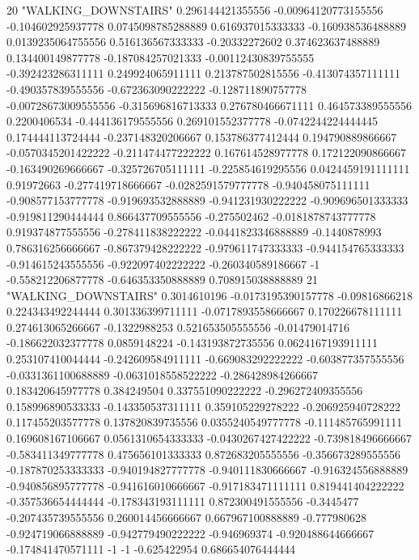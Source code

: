 20 "WALKING_DOWNSTAIRS" 0.296144421355556 -0.00964120773155556 -0.104602925937778 0.0745098785288889 0.616937015333333 -0.160938536488889 0.0139235064755556 0.516136567333333 -0.20332272602 0.374623637488889 0.134400149877778 -0.187084257021333 -0.00112430839755555 -0.392423286311111 0.249924065911111 0.213787502815556 -0.413074357111111 -0.490357839555556 -0.672363090222222 -0.128711890757778 -0.00728673009555556 -0.315696816713333 0.276780466671111 0.464573389555556 0.2200406534 -0.444136179555556 0.269101552377778 -0.0742244224444445 0.174444113724444 -0.237148320206667 0.153786377412444 0.194790889866667 -0.0570345201422222 -0.211474477222222 0.167614528977778 0.172122090866667 -0.163490269666667 -0.325726705111111 -0.225854619295556 0.0424459191111111 0.91972663 -0.277419718666667 -0.0282591579777778 -0.940458075111111 -0.908577153777778 -0.919693532888889 -0.941231930222222 -0.909696501333333 -0.919811290444444 0.866437709555556 -0.275502462 -0.0181878743777778 0.919374877555556 -0.278411838222222 -0.0441823346888889 -0.1440878993 0.786316256666667 -0.867379428222222 -0.979611747333333 -0.944154765333333 -0.914615243555556 -0.922097402222222 -0.260340589186667 -1 -0.558212206877778 -0.646353350888889 0.708915038888889
21 "WALKING_DOWNSTAIRS" 0.3014610196 -0.0173195390157778 -0.09816866218 0.224343492244444 0.301336399711111 -0.0717893558666667 0.170226678111111 0.274613065266667 -0.1322988253 0.521653505555556 -0.01479014716 -0.186622032377778 0.0859148224 -0.143193872735556 0.0624167193911111 0.253107410044444 -0.242609584911111 -0.669083292222222 -0.603877357555556 -0.0331361100688889 -0.0631018558522222 -0.286428984266667 0.183420645977778 0.384249504 0.337551090222222 -0.296272409355556 0.158996890533333 -0.143350537311111 0.359105229278222 -0.206925940728222 0.117455203577778 0.137820839735556 0.0355240549777778 -0.111485765991111 0.169608167106667 0.0561310654333333 -0.0430267427422222 -0.739818496666667 -0.583411349777778 0.475656101333333 0.872683205555556 -0.356673289555556 -0.187870253333333 -0.940194827777778 -0.940111830666667 -0.916324556888889 -0.940856895777778 -0.941616010666667 -0.917183471111111 0.819441404222222 -0.357536654444444 -0.178343193111111 0.872300491555556 -0.3445477 -0.207435739555556 0.260014456666667 0.667967100888889 -0.777980628 -0.924719066888889 -0.942779490222222 -0.946969374 -0.920488644666667 -0.174841470571111 -1 -1 -0.625422954 0.686654076444444
